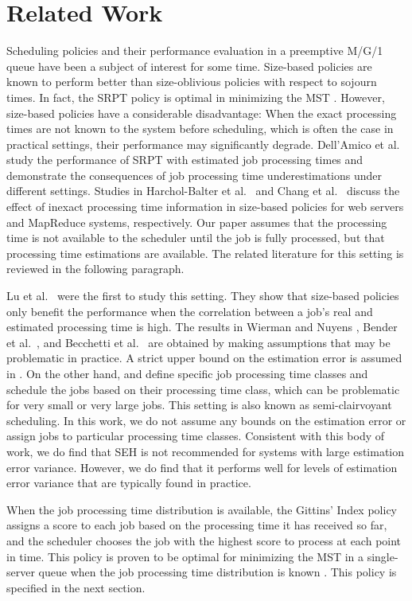 \section{Related Work} \label{LiteratureReview}

Scheduling policies and their performance evaluation in a preemptive M/G/1 queue have been a subject of interest for some time. Size-based policies are known to perform better than size-oblivious policies with respect to sojourn times. In fact, the SRPT policy is optimal in minimizing the MST \cite{schrage1968letter}. However, size-based policies have a considerable disadvantage: When the exact processing times are not known to the system before scheduling, which is often the case in practical settings, their performance may significantly degrade. Dell’Amico et al.\ \cite{dell2015psbs} study the performance of SRPT with estimated job processing times and demonstrate the consequences of job processing time underestimations under different settings. Studies in Harchol-Balter et al.\ \cite{harchol2003size} and Chang et al.\ \cite{chang2011scheduling} discuss the effect of inexact processing time information in size-based policies for web servers and MapReduce systems, respectively. Our paper assumes that the processing time is not available to the scheduler until the job is fully processed, but that processing time estimations are available. The related literature for this setting is reviewed in the following paragraph.

Lu et al.\ \cite{lu2004size} were the first to study this setting. They show that size-based policies only benefit the performance when the correlation between a job’s real and estimated processing time is high. The results in Wierman and Nuyens \cite{wierman2008scheduling}, Bender et al.\ \cite{bender2002improved}, and Becchetti et al.\ \cite{becchetti2004semi} are obtained by making assumptions that may be problematic in practice. A strict upper bound on the estimation error is assumed in \cite{wierman2008scheduling}. On the other hand, \cite{becchetti2004semi} and \cite{bender2002improved} define specific job processing time classes and schedule the jobs based on their processing time class, which can be problematic for very small or very large jobs. This setting is also known as semi-clairvoyant scheduling. In this work, we do not assume any bounds on the estimation error or assign jobs to particular processing time classes. Consistent with this body of work, we do find that SEH is not recommended for systems with large estimation error variance. However, we do find that it performs well for levels of estimation error variance that are typically found in practice.

When the job processing time distribution is available, the Gittins’ Index policy \cite{gittins1979bandit} assigns a score to each job based on the processing time it has received so far, and the scheduler chooses the job with the highest score to process at each point in time. This policy is proven to be optimal for minimizing the MST in a single-server queue when the job processing time distribution is known \cite{aalto2009gittins}. This policy is specified in the next section.




